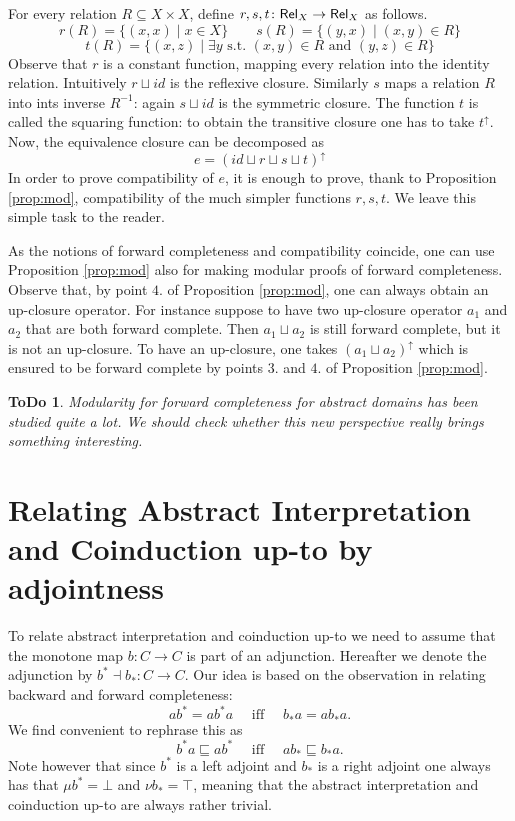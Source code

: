 \documentclass[smallcondensed,envcountsect,envcountsame]{svjour3}     %
\newtheorem{todo}[theorem]{\bf ToDo}
\begin{document}
For every relation $R\subseteq X\times X$, define  $r,s,t\colon \mathsf{Rel}_X \to \mathsf{Rel}_X$ as follows.
$$r(R) = \{(x,x)\mid x\in X \} \qquad s(R)=\{(y,x)\mid (x,y)\in R\}$$ 
$$t(R)=\{(x,z) \mid \exists y \text{ s.t. } (x,y) \in R \text{ and } (y,z)\in R\} $$
Observe that $r$ is a constant function, mapping every relation into the identity relation. Intuitively $r\sqcup id$ is the reflexive closure. 
Similarly $s$ maps a relation $R$ into ints inverse $R^{-1}$: again $s \sqcup id$ is the symmetric closure. The function $t$ is called the squaring function: to obtain the transitive closure one has to take $t^\uparrow$. Now, the equivalence closure can be decomposed as 
$$e= (id\sqcup r \sqcup s \sqcup t )^\uparrow$$
In order to prove compatibility of $e$, it is enough to prove, thank to Proposition \ref{prop:mod}, compatibility of the much simpler functions $r,s,t$. We leave this simple task to the reader.

\begin{remark}
As the notions of forward completeness and compatibility coincide, one can use Proposition \ref{prop:mod} also for making modular proofs of forward completeness. Observe that, by point $4.$ of Proposition \ref{prop:mod}, one can always obtain an up-closure operator. For instance suppose to have two up-closure operator $a_1$ and $a_2$ that are both forward complete. Then $a_1 \sqcup a_2$ is still forward complete, but it is not an up-closure. To have an up-closure, one takes $(a_1\sqcup a_2)^\uparrow$ which is ensured to be forward complete by points $3.$ and $4.$ of Proposition \ref{prop:mod}.
\end{remark}
\begin{todo}
Modularity for forward completeness for abstract domains has been studied quite a lot. We should check whether this new perspective really brings something interesting.
\end{todo}

\section{Relating Abstract Interpretation and Coinduction up-to by adjointness}
To relate abstract interpretation and coinduction up-to we need to assume that the monotone map $b\colon C\to C$ is part of an adjunction.
Hereafter we denote the adjunction by $b^*\dashv b_* \colon C\to C$. Our idea is based on the observation in \cite{} relating backward and forward completeness:
$$ ab^* = ab^*a \quad \text{ iff } \quad b_*a = ab_* a \text{.}$$
We find convenient to rephrase this as
\begin{equation}\label{eq:bridge}
b^*a \sqsubseteq ab^*\quad \text{ iff } \quad ab_* \sqsubseteq b_*a \text{.}
\end{equation}
Note however that since $b^*$ is a left adjoint and $b_*$ is a right adjoint one always has that $\mu b^* = \bot$ and $\nu b_* = \top$, meaning that the abstract interpretation and coinduction up-to are always rather trivial.
\end{document}
